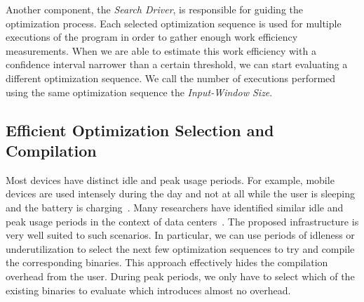     Another component, the \textit{Search Driver}, is responsible for guiding the optimization process. Each selected optimization sequence
    is used for multiple executions of the program in order to gather enough work efficiency measurements. When we are able to
    estimate this work efficiency with a confidence interval narrower than a certain threshold, we can start evaluating a different
    optimization sequence. We call the number of executions performed using the same optimization sequence the \textit{Input-Window Size}.

    \subsection{Efficient Optimization Selection and Compilation}

    Most devices have distinct idle and peak usage periods. For example, mobile devices are used intensely during the day and not at all while
    the user is sleeping and the battery is charging~\citep{mpeis16}. Many researchers have identified similar idle and peak usage periods in
    the context of data centers~\citep{armbrust10,chen12b}. The proposed \itercomp infrastructure is very well suited to such scenarios. In
    particular, we can use periods of idleness or underutilization to select the next few optimization sequences to try and compile the
    corresponding binaries. This approach effectively hides the compilation overhead from the user. During peak periods, we only have to select
    which of the existing binaries to evaluate which introduces almost no overhead.
